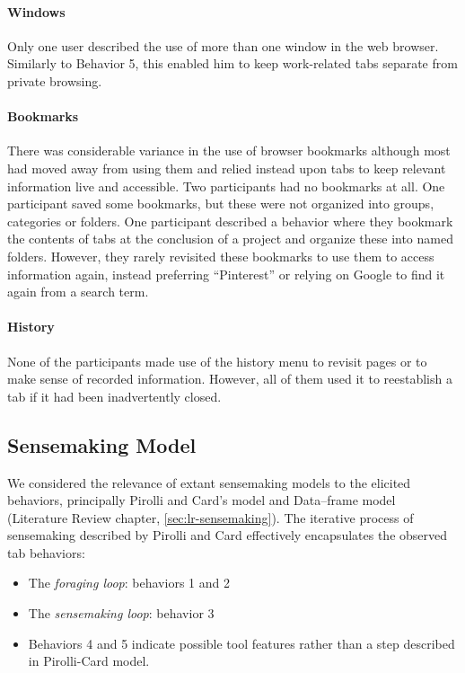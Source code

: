 \paragraph{Windows}
Only one user described the use of more than one window in the web browser. Similarly to Behavior 5, this enabled him to keep work-related tabs separate from private browsing.

\paragraph{Bookmarks}
There was considerable variance in the use of browser bookmarks although most had moved away from using them and relied instead upon tabs to keep relevant information live and accessible. Two participants had no bookmarks at all.  One participant saved some bookmarks, but these were not organized into groups, categories or folders. One participant described a behavior where they bookmark the contents of tabs at the conclusion of a project and organize these into named folders. However, they rarely revisited these bookmarks to use them to access information again, instead preferring ``Pinterest'' or relying on Google to find it again from a search term.

\paragraph{History}
None of the participants made use of the history menu to revisit pages or to make sense of recorded information. However, all of them used it to reestablish a tab if it had been inadvertently closed.

\subsection{Sensemaking Model}
We considered the relevance of extant sensemaking models to the elicited behaviors, principally Pirolli and Card's model and Data--frame model (Literature Review chapter, \autoref{sec:lr-sensemaking}). The iterative process of sensemaking described by Pirolli and Card effectively encapsulates the observed tab behaviors:

\begin{itemize}
	\item The \emph{foraging loop}: behaviors 1 and 2
	\item The \emph{sensemaking loop}: behavior 3
	\item Behaviors 4 and 5 indicate possible tool features rather than a step described in Pirolli-Card model.
\end{itemize}

